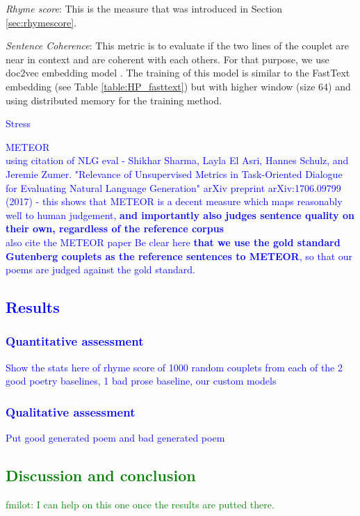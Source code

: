 \documentclass[11pt,a4paper]{article}
\begin{document}
\begin{itemize}
	\item \textit{Rhyme score}: This is the measure that was introduced in Section \ref{sec:rhymescore}.
	\item \textit{Sentence Coherence}: This metric is to evaluate if the two lines of the couplet are near in context and are coherent with each others. For that purpose, we use doc2vec embedding model \cite{docvec}. The training of this model is similar to the FastText embedding (see Table \ref{table:HP_fasttext}) but with higher window (size 64) and using distributed memory for the training method.
\textcolor{blue}{
	\item Stress 
	\item METEOR\\
		using citation of NLG eval - Shikhar Sharma, Layla El Asri, Hannes Schulz, and Jeremie Zumer. "Relevance of Unsupervised Metrics in Task-Oriented Dialogue for Evaluating Natural Language Generation" arXiv preprint arXiv:1706.09799 (2017) - this shows that METEOR is a decent measure which maps reasonably well to human judgement, \textbf{and importantly also judges sentence quality on their own, regardless of the reference corpus}\\
		also cite the METEOR paper
		Be clear here \textbf{that we use the gold standard Gutenberg couplets as the reference sentences to METEOR}, so that our poems are judged against the gold standard.
}
\end{itemize}



\textcolor{blue}{
\subsection{Results}
\label{sec:corpora}
\subsubsection{Quantitative assessment}
Show the stats here of rhyme score of 1000 random couplets from each of the 2 good poetry baselines, 1 bad prose baseline, our custom models
\subsubsection{Qualitative assessment}
Put good generated poem and bad generated poem
}

\textcolor{green}{
\section{Discussion and conclusion}
\label{sec:discconc}
fmilot: I can help on this one once the results are putted there.
}
\end{document}
